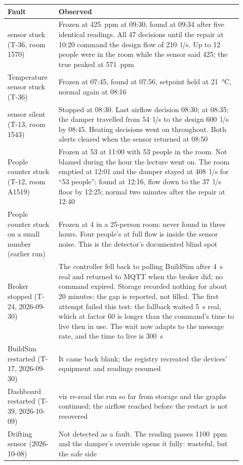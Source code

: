 \begin{longtable}[]{@{}L{0.20\linewidth}L{0.72\linewidth}@{}}
\toprule
\textbf{Fault} & \textbf{Observed} \\
\midrule
\endhead
\COtwo{} sensor stuck (T-36, room 1570) & Frozen at 425~ppm at 09:30, found at
09:34 after five identical readings. All 47 decisions until the repair at
10:20 command the design flow of 210~l/s. Up to 12 people were in the room
while the sensor said 425; the true \COtwo{} peaked at 571~ppm \\
Temperature sensor stuck (T-36) & Frozen at 07:45, found at 07:56, setpoint
held at 21~°C, normal again at 08:16 \\
\COtwo{} sensor silent (T-13, room 1543) & Stopped at 08:30. Last airflow
decision 08:30;  at 08:35; the damper travelled from 54~l/s
to the design 600~l/s by 08:45. Heating decisions went on throughout. Both
alerts cleared when the sensor returned at 08:50 \\
People counter stuck (T-12, room A1519) & Frozen at 53 at 11:00 with 53 people
in the room. Not blamed during the hour the lecture went on. The room emptied
at 12:01 and the damper stayed at 408~l/s for ``53 people''; found at 12:16,
flow down to the 37~l/s floor by 12:25; normal two minutes after the repair at
12:40 \\
People counter stuck on a small number (earlier run) & Frozen at 4 in a
25-person room: never found in three hours. Four people's \COtwo{} at full flow
is inside the sensor noise. This is the detector's documented blind spot \\
Broker stopped (T-24, 2026-09-30) & The controller fell back to polling
BuildSim after 4~s real and returned to MQTT when the broker did; no command
expired. Storage recorded nothing for about 20 minutes: the gap is reported,
not filled. The first attempt failed this test: the fallback waited 5~s real,
which at factor 60 is longer than the command's time to live then in use. The
wait now adapts to the message rate, and the time to live is 300~s \\
BuildSim restarted (T-17, 2026-09-30) & It came back blank; the registry
recreated the devices' equipment and readings resumed \\
Dashboard restarted (T-39, 2026-10-09) & viz re-read the run so far from
storage and the graphs continued; the airflow reached before the restart is
not recovered \\
Drifting \COtwo{} sensor (2026-10-08) & Not detected as a fault. The reading
passes 1100~ppm and the damper's override opens it fully: wasteful, but the
safe side \\
\bottomrule
\end{longtable}
